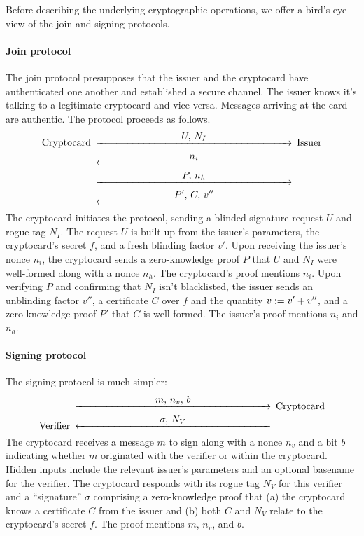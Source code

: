 \bigskip

Before describing the underlying cryptographic operations,
we offer a bird's-eye view of the join and signing protocols.

\paragraph*{Join protocol}
The join protocol presupposes that the issuer and the cryptocard
have authenticated one another and established a secure
channel. The issuer knows it's talking to a legitimate
cryptocard and vice versa. Messages arriving at the card are
authentic. The protocol proceeds as follows.
\[
	\minCDarrowwidth200pt
	\begin{CD}
	\text{Cryptocard}	@>{\displaystyle U,\, N_I}>>	\text{Issuer} \\
	{}	@<{\displaystyle n_i}<<	{} \\
	{}	@>{\displaystyle P,\, n_h}>>	{} \\
	{}	@<{\displaystyle P',\, C,\, v''}<<	{}
	\end{CD}
\]
The cryptocard initiates the protocol, sending a blinded
signature request $U$ and rogue tag $N_I$.
The request $U$ is built up from the issuer's parameters,
the cryptocard's secret $f$, and
a fresh blinding factor $v'$.
Upon receiving the issuer's nonce $n_i$, the cryptocard
sends a zero-knowledge proof $P$ that
$U$ and $N_I$ were well-formed along with a nonce $n_h$.
The cryptocard's proof mentions $n_i$.
Upon verifying $P$ and confirming that $N_I$ isn't blacklisted, the
issuer sends an unblinding factor $v''$, a certificate $C$ over
$f$ and the quantity $v \mathrel{:=} v'+v''$, and a zero-knowledge proof
$P'$ that $C$ is well-formed.
The issuer's proof mentions $n_i$ and $n_h$.

\paragraph*{Signing protocol}
The signing protocol is much simpler:
\[
	\minCDarrowwidth200pt
	\begin{CD}
	{}	@>{\displaystyle m,\, n_v,\, b}>>	\text{Cryptocard} \\
	\text{Verifier}	@<{\displaystyle \sigma,\, N_V}<<	{} \\
	\end{CD}
\]
The cryptocard receives a message $m$ to sign along
with a nonce $n_v$ and
a bit $b$ indicating whether $m$ originated with the verifier or within the cryptocard.
Hidden inputs include the relevant issuer's parameters and an optional
basename for the verifier.
The cryptocard responds with its rogue tag $N_V$ for this verifier
and a ``signature'' $\sigma$ comprising
a zero-knowledge proof that (a) the cryptocard knows a certificate $C$
from the issuer and (b) both $C$ and $N_V$ relate to the cryptocard's secret $f$.
The proof mentions $m$, $n_v$, and $b$.
